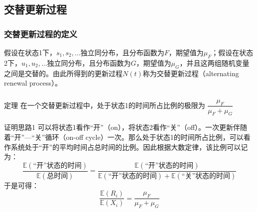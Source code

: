 \documentclass[t]{beamer}
\newcommand{\E}{\mathbb{E}}
\begin{document}
\subsection{交替更新过程}

\begin{frame}
  \frametitle{交替更新过程的定义}
    假设在状态1下，$s_1,s_2,\ldots$独立同分布，且分布函数为$F$，期望值为$\mu_F$；假设在状态2下，$u_1,u_2,\ldots$独立同分布，且分布函数为$G$，期望值为$\mu_G$，并且这两组随机变量之间是交替的。由此所得到的更新过程$N(t)$称为交替更新过程（alternating renewal process）。

    \begin{center}
    \end{center}
\end{frame}


\begin{frame}
  \frametitle{}  
\begin{block}{定理}
  在一个交替更新过程中，处于状态1的时间所占比例的极限为
  $\dfrac{\mu_F}{\mu_F+\mu_G}$
\end{block}

\begin{block}{证明思路1}
  可以将状态1看作“开”（on），将状态2看作“关”（off）。一次更新伴随着“开”—“关”循环（on-off cycle）一次。那么处于状态1的时间所占比例，可以看作系统处于“开”的平均时间占总时间的比例。因此根据大数定律，该比例可以记为：
\begin{equation*}
       \frac{\E(\text{“开”状态的时间})}{\E(\text{总时间})}=
    \frac{\E(\text{“开”状态的时间})}{\E(\text{“开”状态的时间})+\E(\text{“关”状态的时间})}
\end{equation*}
于是可得：
\[\frac{\E(R_i)}{\E(X_i)}=\frac{\mu_F}{\mu_F+\mu_G}\]
\end{block}

  

\end{frame}
\end{document}
